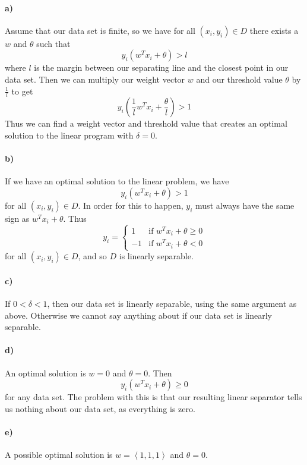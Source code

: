 \documentclass[12pt]{article}
\begin{document}
\paragraph{a)}

Assume that our data set is finite, so we have for all \((x_i,y_i)\in D\) there exists a \(w\) and \(\theta\) such that
\[y_i(w^Tx_i+\theta)>l\]
where \(l\) is the margin between our separating line and the closest point in our data set. Then we can multiply our
weight vector \(w\) and our threshold value \(\theta\) by \(\frac{1}{l}\) to get
\[y_i\left(\frac{1}{l}w^Tx_i+\frac{\theta}{l}\right)>1\]
Thus we can find a weight vector and threshold value that creates an optimal solution to the linear program with \(\delta=0\).

\paragraph{b)}

If we have an optimal solution to the linear problem, we have
\[y_i\left(w^Tx_i+\theta\right)>1\]
for all \((x_i,y_i)\in D\). In order for this to happen, \(y_i\) must always have the same sign as \(w^Tx_i+\theta\). Thus
\[y_i=\begin{cases}
        1 & \text{if }w^Tx_i+\theta\geq 0\\
        -1 & \text{if }w^Tx_i+\theta<0
\end{cases}\]
for all \((x_i,y_i)\in D\), and so \(D\) is linearly separable.

\paragraph{c)}

If \(0<\delta<1\), then our data set is linearly separable, using the same argument as above. Otherwise we cannot say anything about
if our data set is linearly separable.

\paragraph{d)}

An optimal solution is \(w=0\) and \(\theta=0\). Then
\[y_i(w^Tx_i+\theta)\geq 0\]
for any data set. The problem with this is that our resulting linear separator tells us nothing about our data set, as everything is
zero.

\paragraph{e)}

A possible optimal solution is \(w=\left<1,1,1\right>\) and \(\theta=0\).
\end{document}
